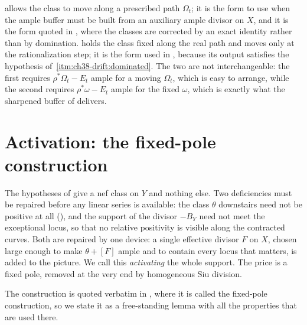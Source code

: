 \begin{remark}
\label{rem:ch38-two-approximation-forms}
 allows the class to move along
a prescribed path $\Omega_t$; it is the form to use when the ample buffer
must be built from an auxiliary ample divisor on $X$, and it is the form
quoted in , where the classes are corrected by an
exact identity rather than by domination.
 holds the class fixed along the
real path and moves only at the rationalization step; it is the form used
in , because its output
satisfies the hypothesis of
\,\cref{itm:ch38-drift:dominated}.  The two
are not interchangeable: the first requires
$\rho^*\Omega_t-E_t$ ample for a moving $\Omega_t$, which is easy to
arrange, while the second requires $\rho^*\omega-E_t$ ample for the fixed
$\omega$, which is exactly what the sharpened buffer of
 delivers.
\end{remark}

\section{Activation: the fixed-pole construction}
\label{sec:ch38-activation}

The hypotheses of  give a nef class
on $Y$ and nothing else.  Two deficiencies must be repaired before any
linear series is available: the class $\theta$ downstairs need not be
positive at all (), and the support of the
divisor $-B_Y$ need not meet the exceptional locus, so that no relative
positivity is visible along the contracted curves.  Both are repaired by
one device: a single effective divisor $F$ on $X$, chosen large enough
to make $\theta+[F]$ ample and to contain every locus that matters, is
added to the picture.  We call this \emph{activating} the whole support.
The price is a fixed pole, removed at the very end by homogeneous Siu
division.

The construction is quoted verbatim in , where it
is called the fixed-pole construction, so we state it as a free-standing
lemma with all the properties that are used there.

